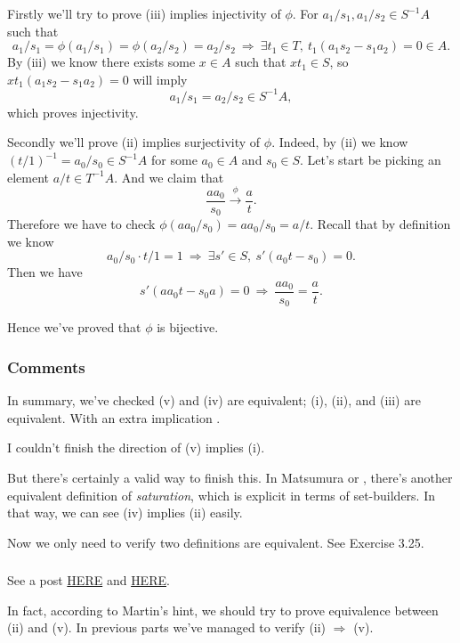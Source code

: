 Firstly we'll try to prove (iii) implies injectivity of $\phi$. For $a_1/s_1,a_1/s_2\in S^{-1}A$ such that \[a_1/s_1=\phi(a_1/s_1)=\phi(a_2/s_2)=a_2/s_2 ~\Rightarrow~ \exists t_1\in T,~ t_1(a_1s_2-s_1a_2)=0\in A.\]
By (iii) we know there exists some $x\in A$ such that $xt_1\in S$, so $xt_1(a_1s_2-s_1a_2)=0$ will imply \[a_1/s_1=a_2/s_2\in S^{-1}A,\] which proves injectivity.

Secondly we'll prove (ii) implies surjectivity of $\phi$.
Indeed, by (ii) we know $(t/1)^{-1}=a_0/s_0\in S^{-1}A$ for some $a_0\in A$ and $s_0\in S$. Let's start be picking an element $a/t\in T^{-1}A$. And we claim that \[\frac{aa_0}{s_0}\overset{\phi}{\rightarrow}\frac{a}{t}.\] Therefore we have to check $\phi(aa_0/s_0)=aa_0/s_0=a/t$. Recall that by definition we know \[a_0/s_0\cdot t/1=1 ~\Rightarrow~ \exists s'\in S,~ s'(a_0t-s_0)=0.\] Then we have \[s'(aa_0t-s_0a)=0 ~\Rightarrow~ \frac{aa_0}{s_0}=\frac{a}{t}.\]

Hence we've proved that $\phi$ is bijective. 

\subsubsection{Comments}

In summary, we've checked (v) and (iv) are equivalent; (i), (ii), and (iii) are equivalent. With an extra implication . 

I couldn't finish the direction of (v) implies (i). 

But there's certainly a valid way to finish this. In Matsumura \cite{matsumura1989commutative} or \cite{altman}, there's another equivalent definition of \textit{saturation}, which is explicit in terms of set-builders. In that way, we can see (iv) implies (ii) easily. 

Now we only need to verify two definitions are equivalent. See \cite{altman} Exercise 3.25.

\subsubsection{}

See a post \href{http://math_research.uct.ac.za/marques/US/AMCh3forSophiesAGSeminar.pdf}{HERE} and \href{https://math.stackexchange.com/questions/308292/s-t-be-multiplicatively-closed-sets-in-the-ring-r-such-that-s-subseteq-t}{HERE}.

In fact, according to Martin's hint, we should try to prove equivalence between (ii) and (v). In previous parts we've managed to verify (ii) $\Rightarrow$ (v).

